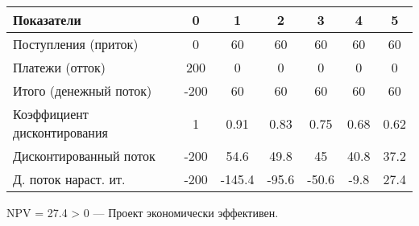 \documentclass[14pt]{extarticle}
\begin{document}
\begin{center}
\begin{tabular}{|l|c|c|c|c|c|c|}
\hline
Показатели          & 0    & 1   & 2   & 3   & 4   & 5   \\
\hline
Поступления (приток) & 0    & 60  & 60  & 60  & 60  & 60  \\
Платежи (отток)     & 200  & 0   & 0   & 0   & 0   & 0   \\
Итого (денежный поток) & -200 & 60  & 60  & 60  & 60  & 60  \\
Коэффициент дисконтирования & 1    & 0.91 & 0.83 & 0.75 & 0.68 & 0.62 \\
Дисконтированный поток & -200 & 54.6  & 49.8  & 45   & 40.8 & 37.2 \\
Д. поток нараст. ит. & -200 & -145.4 & -95.6 & -50.6 & -9.8 & 27.4 \\
\hline
\end{tabular}
\end{center}

NPV = 27.4 > 0 — Проект экономически эффективен.
\end{document}
